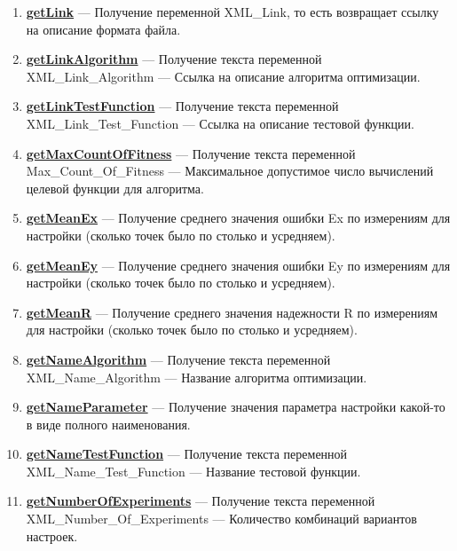 \documentclass[a4paper,12pt]{article}
\begin{document}
\begin{enumerate}
\item \textbf{\hyperref[getLink]{getLink}} --- Получение переменной XML\_Link, то есть возвращает ссылку на описание формата файла.

\item \textbf{\hyperref[getLinkAlgorithm]{getLinkAlgorithm}} --- Получение текста переменной  XML\_Link\_Algorithm --- Ссылка на описание алгоритма оптимизации.

\item \textbf{\hyperref[getLinkTestFunction]{getLinkTestFunction}} --- Получение текста переменной  XML\_Link\_Test\_Function --- Ссылка на описание тестовой функции.

\item \textbf{\hyperref[getMaxCountOfFitness]{getMaxCountOfFitness}} --- Получение текста переменной  Max\_Count\_Of\_Fitness --- Максимальное допустимое число вычислений целевой функции для алгоритма.

\item \textbf{\hyperref[getMeanEx]{getMeanEx}} --- Получение среднего значения ошибки Ex по измерениям для настройки (сколько точек было по столько и усредняем).

\item \textbf{\hyperref[getMeanEy]{getMeanEy}} --- Получение среднего значения ошибки Ey по измерениям для настройки (сколько точек было по столько и усредняем).

\item \textbf{\hyperref[getMeanR]{getMeanR}} --- Получение среднего значения надежности R по измерениям для настройки (сколько точек было по столько и усредняем).

\item \textbf{\hyperref[getNameAlgorithm]{getNameAlgorithm}} --- Получение текста переменной  XML\_Name\_Algorithm --- Название алгоритма оптимизации.

\item \textbf{\hyperref[getNameParameter]{getNameParameter}} --- Получение значения параметра настройки какой-то в виде полного наименования.

\item \textbf{\hyperref[getNameTestFunction]{getNameTestFunction}} --- Получение текста переменной  XML\_Name\_Test\_Function --- Название тестовой функции.

\item \textbf{\hyperref[getNumberOfExperiments]{getNumberOfExperiments}} --- Получение текста переменной  XML\_Number\_Of\_Experiments --- Количество комбинаций вариантов настроек.


\end{enumerate}
\end{document}
